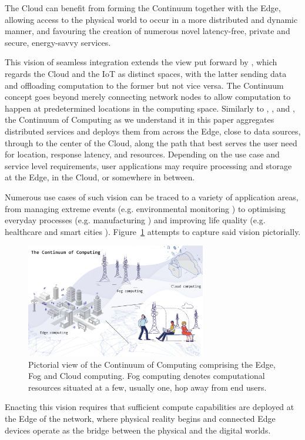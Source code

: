 The Cloud can benefit from forming the Continuum together with the Edge, allowing access to the physical world to occur in a more distributed and dynamic manner, and favouring the creation of numerous novel latency-free, private and secure, energy-savvy services. 

This vision of seamless integration extends the view put forward by \cite{botta2016integration}, which regards the Cloud and the IoT as distinct spaces, with the latter sending data and offloading computation to the former but not vice versa. The Continuum concept goes beyond merely connecting network nodes to allow computation to happen at predetermined locations in the computing space.
Similarly to \cite{latre2014fluid}, \cite{abdelbaky2017computing}, and \cite{beckman2020harnessing}, the Continuum of Computing as we understand it in this paper aggregates distributed services and deploys them from across the Edge, close to data sources, through to the center of the Cloud, along the path that best serves the user need for location, response latency, and resources.
Depending on the use case and service level requirements, user applications may require processing and storage at the Edge, in the Cloud, or somewhere in between.

Numerous use cases of such vision can be traced to a variety of application areas, from managing extreme events (e.g. environmental monitoring \cite{brzoza2016embedded}) to optimising everyday processes (e.g. manufacturing \cite{chen2018edge}) and improving life quality (e.g. healthcare \cite{pace2018edge} and smart cities \cite{he2017multitier}).
Figure~\ref{fig:continuum} attempts to capture said vision pictorially. 
\begin{figure}[ht]
\centering
\includegraphics[width=0.7\textwidth]{figures/continuum}
\caption{Pictorial view of the Continuum of Computing comprising the Edge, Fog and Cloud computing. Fog computing denotes computational resources situated at a few, usually one, hop away from end users.}
\label{fig:continuum}
\end{figure}
Enacting this vision requires that sufficient compute capabilities are deployed at the Edge of the network, where physical reality begins and connected Edge devices operate as the bridge between the physical and the digital worlds.

